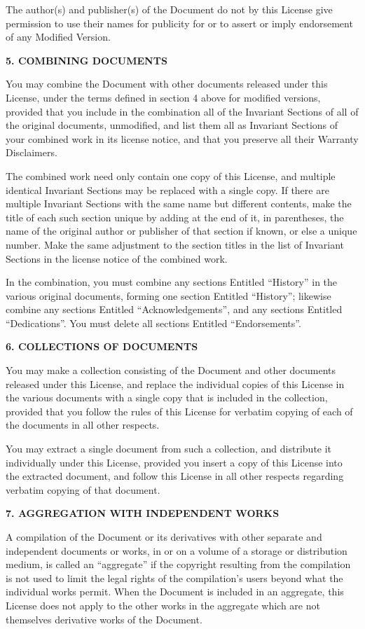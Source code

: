 \documentclass[a4paper,12pt,english]{sphinxmanual}
\begin{document}
The author(s) and publisher(s) of the Document do not by this License
give permission to use their names for publicity for or to assert or
imply endorsement of any Modified Version.

\textbf{5. COMBINING DOCUMENTS}

You may combine the Document with other documents released under this
License, under the terms defined in section 4 above for modified
versions, provided that you include in the combination all of the
Invariant Sections of all of the original documents, unmodified, and
list them all as Invariant Sections of your combined work in its license
notice, and that you preserve all their Warranty Disclaimers.

The combined work need only contain one copy of this License, and
multiple identical Invariant Sections may be replaced with a single
copy. If there are multiple Invariant Sections with the same name but
different contents, make the title of each such section unique by adding
at the end of it, in parentheses, the name of the original author or
publisher of that section if known, or else a unique number. Make the
same adjustment to the section titles in the list of Invariant Sections
in the license notice of the combined work.

In the combination, you must combine any sections Entitled ``History'' in
the various original documents, forming one section Entitled ``History'';
likewise combine any sections Entitled ``Acknowledgements'', and any
sections Entitled ``Dedications''. You must delete all sections Entitled
``Endorsements''.

\textbf{6. COLLECTIONS OF DOCUMENTS}

You may make a collection consisting of the Document and other documents
released under this License, and replace the individual copies of this
License in the various documents with a single copy that is included in
the collection, provided that you follow the rules of this License for
verbatim copying of each of the documents in all other respects.

You may extract a single document from such a collection, and distribute
it individually under this License, provided you insert a copy of this
License into the extracted document, and follow this License in all
other respects regarding verbatim copying of that document.

\textbf{7. AGGREGATION WITH INDEPENDENT WORKS}

A compilation of the Document or its derivatives with other separate and
independent documents or works, in or on a volume of a storage or
distribution medium, is called an ``aggregate'' if the copyright resulting
from the compilation is not used to limit the legal rights of the
compilation’s users beyond what the individual works permit. When the
Document is included in an aggregate, this License does not apply to the
other works in the aggregate which are not themselves derivative works
of the Document.
\end{document}
